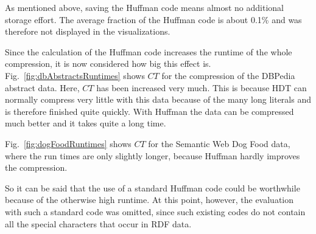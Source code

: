 As mentioned above, saving the Huffman code means almost no additional storage effort. The average fraction of the Huffman code is about 0.1\% and was therefore not displayed in the visualizations.

Since the calculation of the Huffman code increases the runtime of the whole compression, it is now considered how big this effect is. Fig.~\ref{fig:dbAbstractsRuntimes} shows $CT$ for the compression of the DBPedia abstract data. Here, $CT$ has been increased very much. This is because HDT can normally compress very little with this data because of the many long literals and is therefore finished quite quickly. With Huffman the data can be compressed much better and it takes quite a long time.

Fig.~\ref{fig:dogFoodRuntimes} shows $CT$ for the Semantic Web Dog Food data, where the run times are only slightly longer, because Huffman hardly improves the compression.

So it can be said that the use of a standard Huffman code could be worthwhile because of the otherwise high runtime. At this point, however, the evaluation with such a standard code was omitted, since such existing codes do not contain all the special characters that occur in RDF data.


